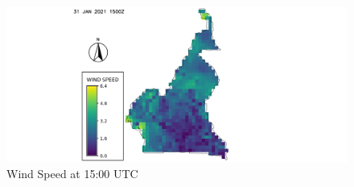 \begin{figure}[H]
\begin{center}
\includegraphics[scale=0.6]{ws15.png} %
\end{center}
\caption{Wind Speed at 15:00 UTC}
\label{Surface Pressure  at 15:00 UTC}%
\end{figure}




